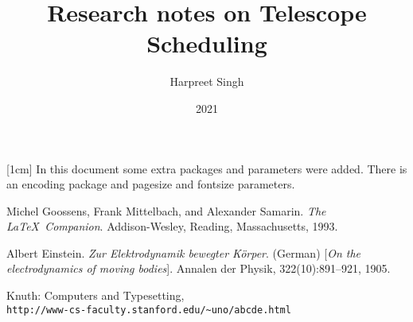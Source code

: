 \documentclass{article}
\title{Research notes on Telescope Scheduling}
\author{Harpreet Singh}
\date{2021}
\begin{document}
\begin{titlepage}
\maketitle
\end{titlepage}

[1cm]
\noindent
In this document some extra packages and parameters
were added. There is an encoding package
and pagesize and fontsize parameters.

\medskip

\begin{thebibliography}{9}
Michel Goossens, Frank Mittelbach, and Alexander Samarin. 
\textit{The \LaTeX\ Companion}. 
Addison-Wesley, Reading, Massachusetts, 1993.

Albert Einstein. 
\textit{Zur Elektrodynamik bewegter K{\"o}rper}. (German) [\textit{On the electrodynamics of moving bodies}]. 
Annalen der Physik, 322(10):891–921, 1905.

Knuth: Computers and Typesetting,
\\\texttt{http://www-cs-faculty.stanford.edu/\~{}uno/abcde.html}
\end{thebibliography}
\end{document}
